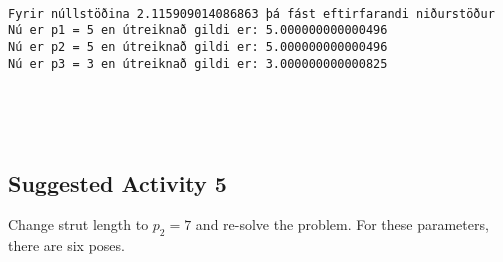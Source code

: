 \documentclass[11pt]{article}
\begin{document}
    \begin{center}
    \end{center}
    { \hspace*{\fill} \\}
    
    \begin{Verbatim}[commandchars=\\\{\}]
Fyrir núllstöðina 2.115909014086863 þá fást eftirfarandi niðurstöður
Nú er p1 = 5 en útreiknað gildi er: 5.000000000000496
Nú er p2 = 5 en útreiknað gildi er: 5.000000000000496
Nú er p3 = 3 en útreiknað gildi er: 3.000000000000825



    \end{Verbatim}

    \begin{center}
    \end{center}
    { \hspace*{\fill} \\}
    
    \newpage
    \hypertarget{suggested-activity-5}{%
\subsection*{Suggested Activity 5}\label{suggested-activity-5}}

Change strut length to \(p_2 = 7\) and re-solve the problem. For these
parameters, there are six poses.
\end{document}
